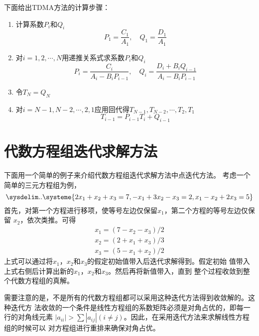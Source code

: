下面给出TDMA方法的计算步骤：
\begin{enumerate}
  \item 计算系数$P_{i}$和$Q_{i}$
    \begin{equation*}
      P_{1} = \frac{C_{1}}{A_{1}}, \quad Q_{1} = \frac{D_{1}}{A_{1}}
    \end{equation*}
  \item 对$i=1,2,\cdots,N$用递推关系式求系数$P_{i}$和$Q_{i}$
    \begin{equation*}
      P_{i} 
      =
      \frac{C_{i}}{A_{i}-B_{i}P_{i-1}}
      ,\quad
      Q_{i}
      =
      \frac{D_{i}+B_{i}Q_{i-1}}{A_{i}-B_{i}P_{i-1}}
    \end{equation*}
  \item 令$T_{N}=Q_{N}$
  \item 对$i=N-1,N-2,\cdots,2,1$应用回代得$T_{N-1},T_{N-2},\cdots,T_{2},T_{1}$
    \begin{equation*}
      T_{i-1}=P_{i-1}T_{i} + Q_{i-1}
    \end{equation*}
\end{enumerate}

\section{代数方程组迭代求解方法}
下面用一个简单的例子来介绍代数方程组迭代求解方法中点迭代方法。
考虑一个简单的三元方程组为例，
\begin{equation}
  \sysdelim..
  \systeme{
    2x_{1} + x_{2} + x_{3} = 7,
    -x_{1} + 3x_{2} -x_{3} = 2,
    x_{1} - x_{2} + 2x_{3} = 5
  }
\end{equation}
首先，对第一个方程进行移项，使等号左边仅保留$x_{1}$，第二个方程的等号左边仅保留
$x_{2}$，依次类推。可得
\begin{equation}
\begin{aligned}
    x_{1} =(7-x_{2}-x_{3})/2 \\
    x_{2} =(2 +x_{1} +x_{3} )/ 3 \\
    x_{3} =(5- x_{1} + x_{2} )/ 2
\end{aligned}
\label{EqLA_pointiteration}
\end{equation}
上式可以通过将$x_{1}$，$x_{2}$和$x_{3}$的假定初始值带入后迭代求解得到。假定初始
值带入上式右侧后计算出新的$x_{1}$，$x_{2}$和$x_{3}$。然后再将新值带入，直到
整个过程收敛到整个代数方程组的真解。

需要注意的是，不是所有的代数方程组都可以采用这种迭代方法得到收敛解的。这种迭代方
法收敛的一个条件是线性方程组的系数矩阵必须是对角占优的，即每一行的对角线元素
$|a_{ii}|>\sum |a_{ij}|(i\ne j)$。因此，在采用迭代方法来求解线性方程组的时候可以
对方程组进行重排来确保对角占优。

